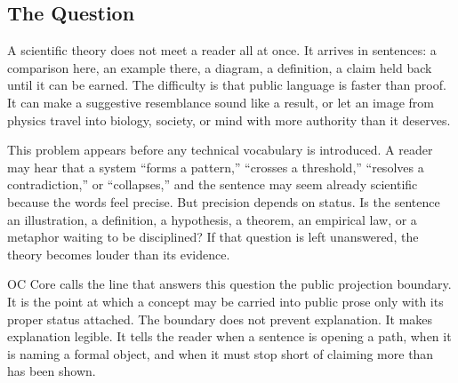 \documentclass[11pt,a4paper,openany]{book}
\begin{document}
\subsection{The Question}
A scientific theory does not meet a reader all at once. It arrives in sentences: a comparison here, an example there, a diagram, a definition, a claim held back until it can be earned. The difficulty is that public language is faster than proof. It can make a suggestive resemblance sound like a result, or let an image from physics travel into biology, society, or mind with more authority than it deserves. \cite{landau_stat_physics,prigogine_dissipative}\par
This problem appears before any technical vocabulary is introduced. A reader may hear that a system ``forms a pattern,'' ``crosses a threshold,'' ``resolves a contradiction,'' or ``collapses,'' and the sentence may seem already scientific because the words feel precise. But precision depends on status. Is the sentence an illustration, a definition, a hypothesis, a theorem, an empirical law, or a metaphor waiting to be disciplined? If that question is left unanswered, the theory becomes louder than its evidence.\par
OC Core calls the line that answers this question the public projection boundary. It is the point at which a concept may be carried into public prose only with its proper status attached. The boundary does not prevent explanation. It makes explanation legible. It tells the reader when a sentence is opening a path, when it is naming a formal object, and when it must stop short of claiming more than has been shown.\par
\end{document}
